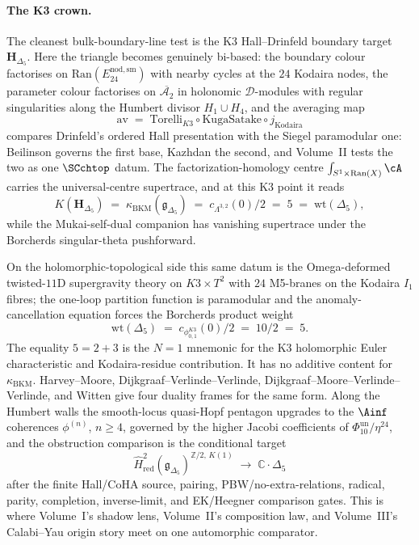 \paragraph{The K3 crown.}
The cleanest bulk-boundary-line test is the K3 Hall--Drinfeld boundary
target $\mathbf{H}_{\Delta_5}$. Here the triangle becomes genuinely
bi-based: the boundary colour factorises on
$\mathrm{Ran}(E^{\mathrm{nod,sm}}_{24})$ with nearby cycles at the
$24$ Kodaira nodes, the parameter colour factorises on
$\overline{\mathcal{A}_2}$ in holonomic $\mathcal{D}$-modules with
regular singularities along the Humbert divisor $H_1\cup H_4$, and
the averaging map
\[
\mathrm{av}
\;=\;
\mathrm{Torelli}_{K3}\circ\mathrm{KugaSatake}\circ j_{\mathrm{Kodaira}}
\]
compares Drinfeld's ordered Hall presentation with the Siegel
paramodular one: Beilinson governs the first base, Kazhdan the
second, and Volume~II tests the two as one $\SCchtop$ datum. The factorization-homology centre
$\int_{S^1\times\mathrm{Ran}(X)}\cA$ carries the universal-centre
supertrace, and at this K3 point it reads
\[
K(\mathbf{H}_{\Delta_5})
\;=\;
\kappa_{\mathrm{BKM}}(\mathfrak{g}_{\Delta_5})
\;=\;
c_{\Lambda^{3,2}}(0)/2
\;=\;
5
\;=\;
\mathrm{wt}(\Delta_5),
\]
while the Mukai-self-dual companion has vanishing supertrace under the
Borcherds singular-theta pushforward.

On the holomorphic-topological side this same datum is the
Omega-deformed twisted-$11$D supergravity theory on $K3\times T^2$
with $24$ M5-branes on the Kodaira $I_1$ fibres; the one-loop
partition function is paramodular and the anomaly-cancellation
equation forces the Borcherds product weight
\[
\mathrm{wt}(\Delta_5)
\;=\;
c_{\phi_{0,1}^{K3}}(0)/2
\;=\;
10/2
\;=\;
5.
\]
The equality $5=2+3$ is the $N=1$ mnemonic for the K3 holomorphic
Euler characteristic and Kodaira-residue contribution. It has no
additive content for $\kappa_{\mathrm{BKM}}$.
Harvey--Moore, Dijkgraaf--Verlinde--Verlinde,
Dijkgraaf--Moore--Verlinde--Verlinde, and Witten give four duality
frames for the same form. Along the Humbert walls the smooth-locus
quasi-Hopf pentagon upgrades to the $\Ainf$ coherences
$\phi^{(n)}$, $n\geq 4$, governed by the higher Jacobi coefficients of
$\Phi_{10}^{\mathrm{un}}/\eta^{24}$, and the obstruction comparison is
the conditional target
\[
\widehat H^2_{\mathrm{red}}\!
  \left(\mathfrak{g}_{\Delta_5}\right)^{\mathbb{Z}/2,\,K(1)}
\;\longrightarrow\;
\mathbb{C}\cdot\Delta_5
\]
after the finite Hall/CoHA source, pairing, PBW/no-extra-relations,
radical, parity, completion, inverse-limit, and EK/Heegner comparison
gates. This is where Volume~I's shadow lens, Volume~II's composition
law, and Volume~III's Calabi--Yau origin story meet on one automorphic
comparator.

